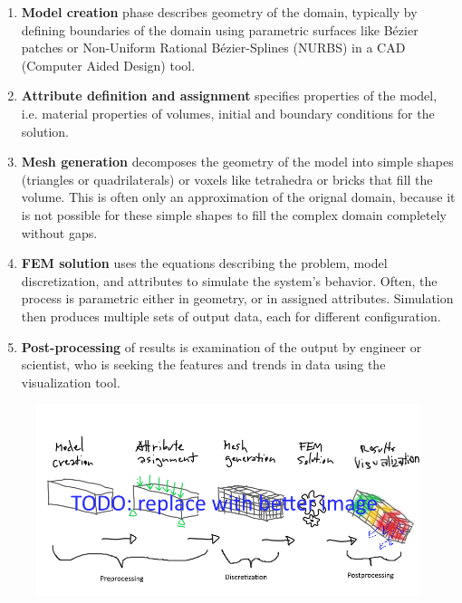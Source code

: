 \begin{enumerate}
    \item \textbf{Model creation} phase describes geometry of the domain, typically by defining boundaries of the domain using parametric surfaces like Bézier patches or Non-Uniform Rational B\'ezier-Splines (NURBS) \cite{Marsh2006} in a CAD (Computer Aided Design) tool.
    \item \textbf{Attribute definition and assignment} specifies properties of the model, i.e. material properties of volumes, initial and boundary conditions for the solution.
    \item \textbf{Mesh generation} decomposes the geometry of the model into simple shapes (triangles or quadrilaterals) or voxels like tetrahedra or bricks that fill the volume. This is often only an approximation of the orignal domain, because it is not possible for these simple shapes to fill the complex domain completely without gaps.
    \item \textbf{FEM solution} uses the equations describing the problem, model discretization, and attributes to simulate the system's behavior. Often, the process is parametric either in geometry, or in assigned attributes. Simulation then produces multiple sets of output data, each for different configuration.
    \item \textbf{Post-processing} of results is examination of the output by engineer or scientist, who is seeking the features and trends in data using the visualization tool.
\end{enumerate}

\begin{figure}[H]
    \centering
    \includegraphics[width=\textwidth]{figures/chapter-introduction/FEA-phases}
    \decoRule
    \caption[]{}
    \label{fig:FEA-phases}
\end{figure}

